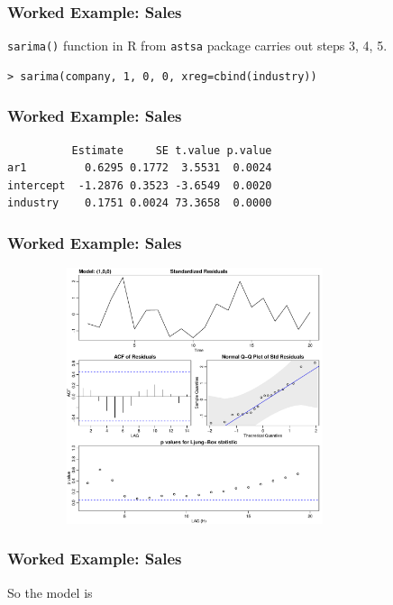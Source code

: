 \documentclass[%
xcolor=pdftex]{beamer}
\begin{document}
\begin{frame}[fragile]
\frametitle{Worked Example: Sales}

\verb=sarima()= function in R from \verb=astsa= package carries out steps 3, 4, 5. 

\begin{verbatim}
> sarima(company, 1, 0, 0, xreg=cbind(industry))
\end{verbatim}


\end{frame}



\begin{frame}[fragile]
\frametitle{Worked Example: Sales}


\begin{verbatim}
          Estimate     SE t.value p.value
ar1         0.6295 0.1772  3.5531  0.0024
intercept  -1.2876 0.3523 -3.6549  0.0020
industry    0.1751 0.0024 73.3658  0.0000
\end{verbatim}


\end{frame}

\begin{frame}
\frametitle{Worked Example: Sales}


\includegraphics[width=110mm, height=75mm]{diag1.pdf}



\end{frame}

\begin{frame}
\frametitle{Worked Example: Sales}

So the model is

\vspace{50mm}

\end{frame}
\end{document}
